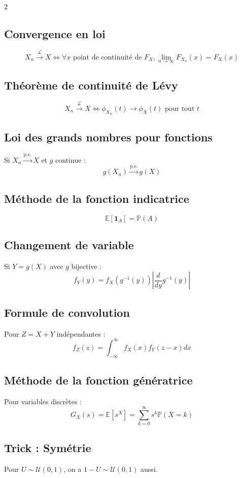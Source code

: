 \documentclass[10pt,a4paper]{article}
\begin{document}
\begin{multicols}{2}
\subsection*{Convergence en loi}
\[
X_n \xrightarrow{\mathcal{L}} X \Leftrightarrow \forall x \text{ point de continuité de } F_X, \lim_{n \to \infty} F_{X_n}(x) = F_X(x)
\]

\subsection*{Théorème de continuité de Lévy}
\[
X_n \xrightarrow{\mathcal{L}} X \Leftrightarrow \phi_{X_n}(t) \to \phi_X(t) \text{ pour tout } t
\]

\subsection*{Loi des grands nombres pour fonctions}
Si $X_n \xrightarrow{\text{p.s.}} X$ et $g$ continue :
\[
g(X_n) \xrightarrow{\text{p.s.}} g(X)
\]

\subsection*{Méthode de la fonction indicatrice}
\[
\mathbb{E}[\mathbf{1}_A] = \mathbb{P}(A)
\]

\subsection*{Changement de variable}
Si $Y = g(X)$ avec $g$ bijective :
\[
f_Y(y) = f_X(g^{-1}(y)) \left|\frac{d}{dy} g^{-1}(y)\right|
\]

\subsection*{Formule de convolution}
Pour $Z = X + Y$ indépendantes :
\[
f_Z(z) = \int_{-\infty}^{\infty} f_X(x) f_Y(z-x) dx
\]

\subsection*{Méthode de la fonction génératrice}
Pour variables discrètes :
\[
G_X(s) = \mathbb{E}[s^X] = \sum_{k=0}^{\infty} s^k \mathbb{P}(X = k)
\]

\subsection*{Trick : Symétrie}
Pour $U \sim \mathcal{U}(0,1)$, on a $1-U \sim \mathcal{U}(0,1)$ aussi.


\end{multicols}
\end{document}
